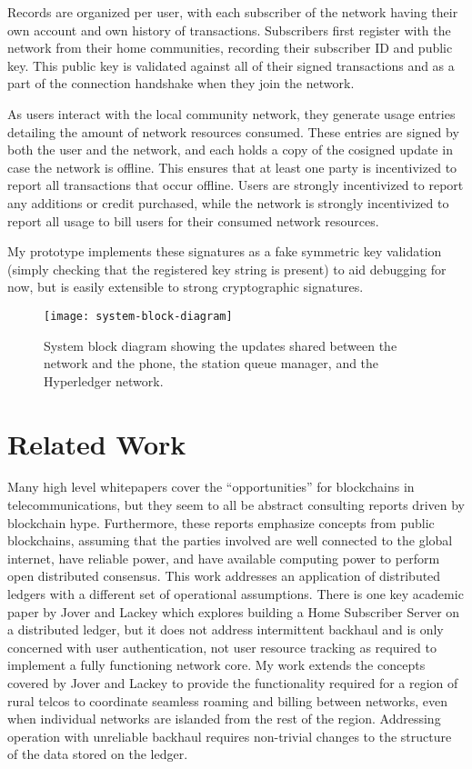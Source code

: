 Records are organized per user, with each subscriber of the network
having their own account and own history of transactions. Subscribers
first register with the network from their home communities, recording
their subscriber ID and public key. This public key is validated
against all of their signed transactions and as a part of the
connection handshake when they join the network.

As users interact with the local community network, they generate
usage entries detailing the amount of network resources
consumed. These entries are signed by both the user and the network,
and each holds a copy of the cosigned update in case the network is
offline. This ensures that at least one party is incentivized to
report all transactions that occur offline. Users are strongly
incentivized to report any additions or credit purchased, while the
network is strongly incentivized to report all usage to bill users for
their consumed network resources.

My prototype implements these signatures as a fake symmetric key
validation (simply checking that the registered key string is present)
to aid debugging for now, but is easily extensible to strong
cryptographic signatures.

\begin{figure*}[t]
  \texttt{[image: system-block-diagram]}
  \caption{System block diagram showing the updates shared between the
    network and the phone, the station queue manager, and the
    Hyperledger network.}
\end{figure*}

\section{Related Work}
Many high level whitepapers cover the ``opportunities'' for
blockchains in
telecommunications\cite{BabuBlockchainTelco2016}\cite{BubleyBlockchainTelecomsIndustry2017}\cite{BaeOperatingmiddledigital},
but they seem to all be abstract consulting reports driven by
blockchain hype. Furthermore, these reports emphasize concepts from
public blockchains, assuming that the parties involved are well
connected to the global internet, have reliable power, and have
available computing power to perform open distributed consensus. This
work addresses an application of distributed ledgers with a different
set of operational assumptions. There is one key academic paper by
Jover and Lackey\cite{JoverdHSSdistributedPeertoPeer2016a} which
explores building a Home Subscriber Server on a distributed ledger,
but it does not address intermittent backhaul and is only concerned
with user authentication, not user resource tracking as required to
implement a fully functioning network core. My work extends the
concepts covered by Jover and Lackey to provide the functionality
required for a region of rural telcos to coordinate seamless roaming
and billing between networks, even when individual networks are
islanded from the rest of the region. Addressing operation with
unreliable backhaul requires non-trivial changes to the structure of
the data stored on the ledger.

